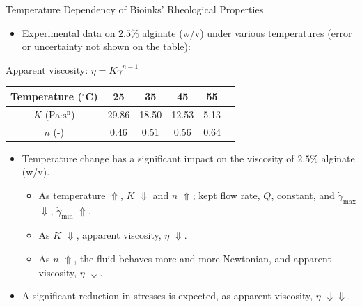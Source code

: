 \begin{frame}{Temperature Dependency of Bioinks' Rheological Properties}

\small
\begin{itemize}
    \item Experimental data on $2.5\%$ alginate (w/v) under various temperatures (error or uncertainty not shown on the table)\footnotemark:
\end{itemize}
\begin{center}
Apparent viscosity: $\eta = K\dot{\gamma}^{n-1}$
  \renewcommand{\arraystretch}{1.2}
  \begin{tabular}{ c c c c c c}
    \hline
    Temperature ($^{\circ}$C) & 25 & 35 & 45 & 55 \\ \hline
    $K$ (Pa$\cdot \text{s}^\text{n}$) & 29.86 & 18.50 & 12.53 & 5.13 \\
    $n$ (-) & 0.46 & 0.51 & 0.56 & 0.64 \\
  \hline
  \end{tabular}
\end{center}
\vspace{-0.1cm}
\begin{itemize}
    \item Temperature change has a significant impact on the viscosity of $2.5\%$ alginate (w/v).
    \begin{itemize}
        \setlength{\itemsep}{2mm}
        \item As temperature $\Uparrow$, $K$ $\Downarrow$ and $n$ $\Uparrow$; kept flow rate, $Q$, constant, and $\dot{\gamma}_\text{max}$ $\Downarrow$, $\dot{\gamma}_\text{min}$ $\Uparrow$.
        \item As $K$ $\Downarrow$, apparent viscosity, $\eta$ $\Downarrow$.
        \item As $n$ $\Uparrow$, the fluid behaves more and more Newtonian, and apparent viscosity, $\eta$ $\Downarrow$.
    \end{itemize}
    \item A significant reduction in stresses is expected, as apparent viscosity, $\eta$ $\Downarrow$$\Downarrow$.
\end{itemize}

\end{frame}


